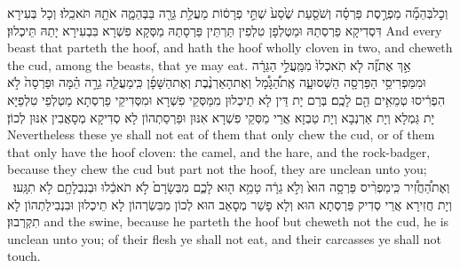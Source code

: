 {וְכׇל\maqqaf בְּהֵמָ֞ה מַפְרֶ֣סֶת פַּרְסָ֗ה וְשֹׁסַ֤עַת שֶׁ֙סַע֙ שְׁתֵּ֣י פְרָס֔וֹת מַעֲלַ֥ת גֵּרָ֖ה בַּבְּהֵמָ֑ה אֹתָ֖הּ תֹּאכֵֽלוּ׃}
{וְכָל בְּעִירָא דִּסְדִיקָא פַרְסְתַהּ וּמַטְלְפָן טִלְפִין תַּרְתֵּין פַּרְסָתַהּ מַסְּקָא פִשְׁרָא בִּבְעִירָא יָתַהּ תֵּיכְלוּן׃}
{And every beast that parteth the hoof, and hath the hoof wholly cloven in two, and cheweth the cud, among the beasts, that ye may eat.}{}
{אַ֣ךְ אֶת\maqqaf זֶ֞ה לֹ֤א תֹֽאכְלוּ֙ מִמַּֽעֲלֵ֣י הַגֵּרָ֔ה וּמִמַּפְרִיסֵ֥י הַפַּרְסָ֖ה הַשְּׁסוּעָ֑ה אֶֽת\maqqaf הַ֠גָּמָ֠ל וְאֶת\maqqaf הָאַרְנֶ֨בֶת וְאֶת\maqqaf הַשָּׁפָ֜ן כִּֽי\maqqaf מַעֲלֵ֧ה גֵרָ֣ה הֵ֗מָּה וּפַרְסָה֙ לֹ֣א הִפְרִ֔יסוּ טְמֵאִ֥ים הֵ֖ם לָכֶֽם׃}
{בְּרַם יָת דֵּין לָא תֵיכְלוּן מִמַּסְּקֵי פִשְׁרָא וּמִסְּדִיקֵי פַרְסְתָא מַטְלְפֵי טִלְפַיָּא יָת גַּמְלָא וְיָת אַרְנְבָא וְיָת טַבְזָא אֲרֵי מַסְּקֵי פִשְׁרָא אִנּוּן וּפַרְסַתְהוֹן לָא סְדִיקָא מְסָאֲבִין אִנּוּן לְכוֹן׃}
{Nevertheless these ye shall not eat of them that only chew the cud, or of them that only have the hoof cloven: the camel, and the hare, and the rock-badger, because they chew the cud but part not the hoof, they are unclean unto you;}{}
{וְאֶת\maqqaf הַ֠חֲזִ֠יר כִּֽי\maqqaf מַפְרִ֨יס פַּרְסָ֥ה הוּא֙ וְלֹ֣א גֵרָ֔ה טָמֵ֥א ה֖וּא לָכֶ֑ם מִבְּשָׂרָם֙ לֹ֣א תֹאכֵ֔לוּ וּבְנִבְלָתָ֖ם לֹ֥א תִגָּֽעוּ׃ \setuma }
{וְיָת חֲזִירָא אֲרֵי סְדִיק פַּרְסְתָא הוּא וְלָא פָשַׁר מְסָאַב הוּא לְכוֹן מִבִּשְׂרְהוֹן לָא תֵיכְלוּן וּבִנְבִילַתְהוֹן לָא תִקְרְבוּן׃}
{and the swine, because he parteth the hoof but cheweth not the cud, he is unclean unto you; of their flesh ye shall not eat, and their carcasses ye shall not touch.}{}
